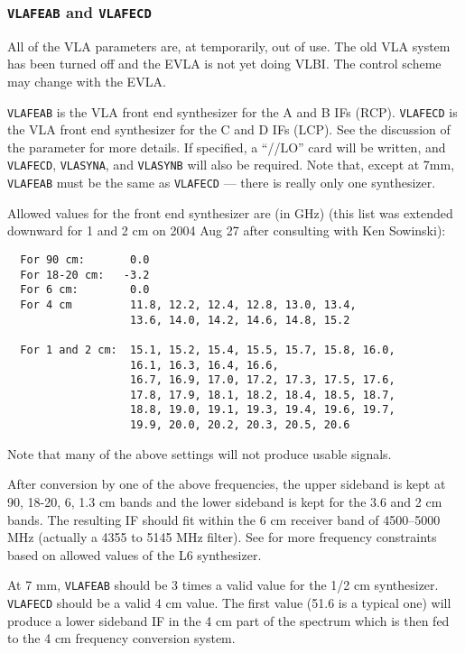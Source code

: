 \documentclass{report}
\begin{document}
\subsubsection{\label{SP:VLAFEAB}{\tt VLAFEAB} and {\tt VLAFECD}}

All of the VLA parameters are, at temporarily, out of use.  The old
VLA system has been turned off and the EVLA is not yet doing VLBI.
The control scheme may change with the EVLA.

{\tt VLAFEAB} is the VLA front end synthesizer for the A and B IFs
(RCP).  {\tt VLAFECD} is the VLA front end synthesizer for the C and D
IFs (LCP).  See the discussion of the parameter  for more details. If specified, a ``//LO'' card
will be written, and {\tt VLAFECD}, {\tt VLASYNA}, and {\tt VLASYNB}
will also be required.  Note that, except at 7mm, {\tt VLAFEAB} must
be the same as {\tt VLAFECD} --- there is really only one synthesizer.

Allowed values for the front end synthesizer are (in GHz) (this list
was extended downward for 1 and 2 cm on 2004 Aug 27 after consulting
with Ken Sowinski):

\begin{verbatim}
  For 90 cm:       0.0
  For 18-20 cm:   -3.2
  For 6 cm:        0.0
  For 4 cm         11.8, 12.2, 12.4, 12.8, 13.0, 13.4,
                   13.6, 14.0, 14.2, 14.6, 14.8, 15.2

  For 1 and 2 cm:  15.1, 15.2, 15.4, 15.5, 15.7, 15.8, 16.0,
                   16.1, 16.3, 16.4, 16.6,
                   16.7, 16.9, 17.0, 17.2, 17.3, 17.5, 17.6,
                   17.8, 17.9, 18.1, 18.2, 18.4, 18.5, 18.7,
                   18.8, 19.0, 19.1, 19.3, 19.4, 19.6, 19.7,
                   19.9, 20.0, 20.2, 20.3, 20.5, 20.6

\end{verbatim}

Note that many of the above settings will not produce usable
signals.

After conversion by one of the above frequencies, the upper sideband
is kept at 90, 18-20, 6, 1.3 cm bands and the lower sideband is
kept for the 3.6 and 2 cm bands.  The resulting IF should fit within the
6 cm receiver band of 4500--5000 MHz (actually a 4355 to 5145 MHz
filter).  See 
for more frequency constraints based on allowed values of the L6
synthesizer.

At 7 mm, {\tt VLAFEAB} should be 3 times a valid value for the
1/2 cm synthesizer.  {\tt VLAFECD} should be a valid 4 cm value.
The first value (51.6 is a typical one) will produce a lower
sideband IF in the 4 cm part of the spectrum which is then fed
to the 4 cm frequency conversion system.
\end{document}
